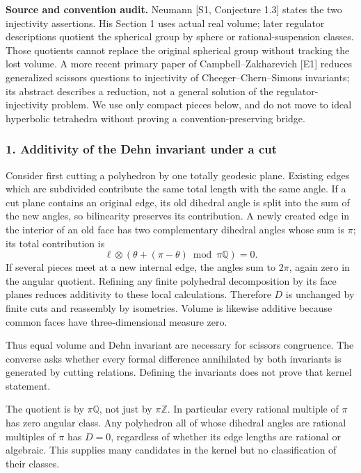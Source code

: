 \documentclass[11pt]{article}
\begin{document}
\textbf{Source and convention audit.} Neumann [S1, Conjecture 1.3] states the two injectivity assertions. His Section 1 uses actual real volume; later regulator descriptions quotient the spherical group by sphere or rational-suspension classes. Those quotients cannot replace the original spherical group without tracking the lost volume. A more recent primary paper of Campbell--Zakharevich [E1] reduces generalized scissors questions to injectivity of Cheeger--Chern--Simons invariants; its abstract describes a reduction, not a general solution of the regulator-injectivity problem. We use only compact pieces below, and do not move to ideal hyperbolic tetrahedra without proving a convention-preserving bridge.

\subsubsection{1. Additivity of the Dehn invariant under a cut}
Consider first cutting a polyhedron by one totally geodesic plane. Existing edges which are subdivided contribute the same total length with the same angle. If a cut plane contains an original edge, its old dihedral angle is split into the sum of the new angles, so bilinearity preserves its contribution. A newly created edge in the interior of an old face has two complementary dihedral angles whose sum is $\pi$; its total contribution is
\[
 \ell\otimes(\theta+(\pi-\theta)\bmod\pi\mathbb Q)=0.
\]
If several pieces meet at a new internal edge, the angles sum to $2\pi$, again zero in the angular quotient. Refining any finite polyhedral decomposition by its face planes reduces additivity to these local calculations. Therefore $D$ is unchanged by finite cuts and reassembly by isometries. Volume is likewise additive because common faces have three-dimensional measure zero.

Thus equal volume and Dehn invariant are necessary for scissors congruence. The converse asks whether every formal difference annihilated by both invariants is generated by cutting relations. Defining the invariants does not prove that kernel statement.

The quotient is by $\pi\mathbb Q$, not just by $\pi\mathbb Z$. In particular every rational multiple of $\pi$ has zero angular class. Any polyhedron all of whose dihedral angles are rational multiples of $\pi$ has $D=0$, regardless of whether its edge lengths are rational or algebraic. This supplies many candidates in the kernel but no classification of their classes.
\end{document}
